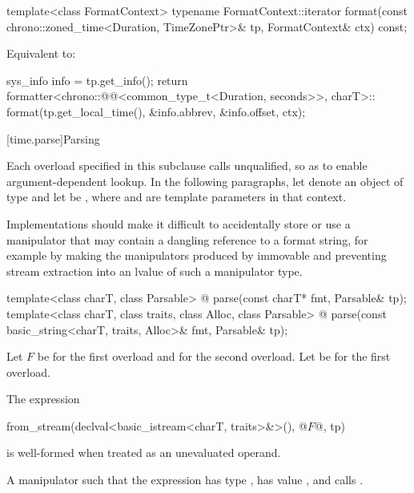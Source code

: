 %
\begin{itemdecl}
template<class FormatContext>
  typename FormatContext::iterator
    format(const chrono::zoned_time<Duration, TimeZonePtr>& tp, FormatContext& ctx) const;
\end{itemdecl}

\begin{itemdescr}
\pnum
\effects
Equivalent to:
\begin{codeblock}
sys_info info = tp.get_info();
return formatter<chrono::@@<common_type_t<Duration, seconds>>, charT>::
         format({tp.get_local_time(), &info.abbrev, &info.offset}, ctx);
\end{codeblock}
\end{itemdescr}

%

[time.parse]{Parsing}

%

\pnum
Each  overload specified in this subclause
calls  unqualified,
so as to enable argument-dependent lookup.
In the following paragraphs,
let  denote an object of type  and
let  be ,
where  and  are template parameters in that context.

\pnum
\recommended
Implementations should make it difficult to accidentally store or use
a manipulator that may contain a dangling reference to a format string,
for example by making the manipulators produced by  immovable and
preventing stream extraction into an lvalue of such a manipulator type.

\begin{itemdecl}
template<class charT, class Parsable>
  @\unspec@
    parse(const charT* fmt, Parsable& tp);
template<class charT, class traits, class Alloc, class Parsable>
  @\unspec@
    parse(const basic_string<charT, traits, Alloc>& fmt, Parsable& tp);
\end{itemdecl}

\begin{itemdescr}
\pnum
Let $F$ be  for the first overload and
 for the second overload.
Let  be  for the first overload.

\pnum
\constraints
The expression
\begin{codeblock}
from_stream(declval<basic_istream<charT, traits>&>(), @$F$@, tp)
\end{codeblock}
is well-formed when treated as an unevaluated operand.

\pnum
\returns
A manipulator such that
the expression 
has type ,
has value , and
calls .
\end{itemdescr}

